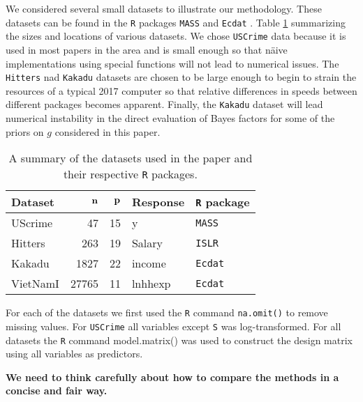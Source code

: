 We considered several small datasets to illustrate our methodology. These datasets
can be found in the {\tt R} packages {\tt MASS} \citep{Venables2002} and 
{\tt Ecdat} \citep{Croissant2016}. Table \ref{tab:datasets} summarizing the sizes and 
locations of various datasets. We chose {\tt USCrime} data because it is used in most papers in
the area and is small enough so that n\"aive implementations using special functions will
not lead to numerical issues. The {\tt Hitters} nad {\tt Kakadu} datasets are chosen to
be large enough to begin to strain the resources of a typical 2017 computer so that
relative differences in speeds between different packages becomes apparent. Finally, the
{\tt Kakadu} dataset will lead numerical instability in the direct evaluation of Bayes
factors for some of the priors on $g$ considered in this paper.

\begin{table}[h]
	\begin{center}
\begin{tabular}{l|r|r|l|l}
{\bf Dataset}	& ${\bf n}$ & ${\bf p}$ & Response & {\bf {\tt R} package} \\ 
	\hline 
UScrime 	& 47 & 15 & y & {\tt MASS} \\  
Hitters	& 263 & 19 & Salary & {\tt ISLR} \\ 
Kakadu	& 1827 & 22 & income & {\tt Ecdat}   \\  
VietNamI	& 27765 & 11 & lnhhexp & {\tt Ecdat}  \\ 
\end{tabular} 
	\end{center}
\caption{A summary of the datasets used in the paper and their respective {\tt R} packages.}
\label{tab:datasets}
\end{table}
 
For each of the datasets we first used the {\tt R} command {\tt na.omit()} to remove missing values. For {\tt USCrime} all variables except {\tt S} was log-transformed. For all datasets
the {\tt R} command {model.matrix()} was used to construct the design matrix using all 
variables as predictors.

\bigskip 

{\bf We need to think carefully about how to compare the methods in a concise  and fair way.}

